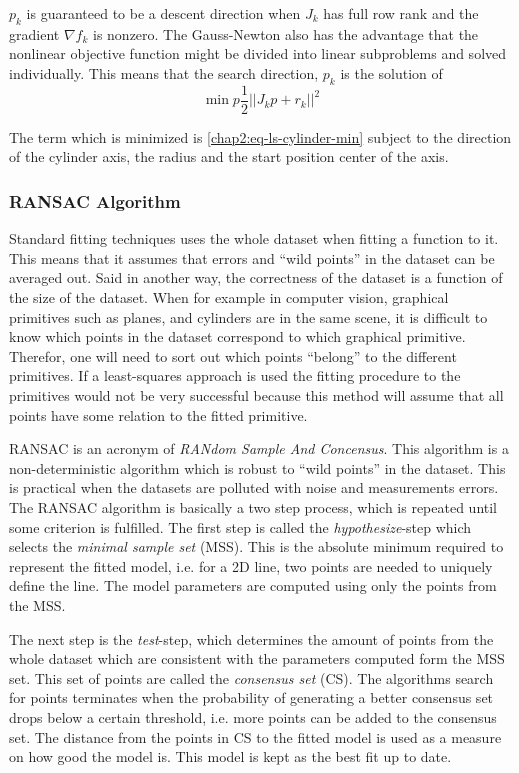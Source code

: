 $p_k$ is guaranteed to be a descent direction when $J_k$ has full row rank and the
gradient $\nabla f_k$ is nonzero. The Gauss-Newton also has the advantage that the
nonlinear objective function might be divided into linear subproblems and solved
individually. This means that the search direction, $p_k$ is the solution of
\begin{equation}
    \min{p} \frac{1}{2} || J_k p + r_k ||^2
\end{equation}

The term which is minimized is \eqref{chap2:eq-ls-cylinder-min} subject to the direction
of the cylinder axis, the radius and the start position center of the axis. 


\subsubsection{RANSAC Algorithm}
Standard fitting techniques uses the whole dataset when fitting a function to it. This
means that it assumes that errors and ``wild points'' in the dataset can be averaged out.
Said in another way, the correctness of the dataset is a function of the size of the
dataset. When for example in computer vision, graphical primitives such as planes, and
cylinders are in the same scene, it is difficult to know which points in the dataset
correspond to which graphical primitive. Therefor, one will need to sort out which points
``belong'' to the different primitives. If a least-squares approach is used the fitting
procedure to the primitives would not be very successful because this method will assume
that all points have some relation to the fitted primitive. \cite{ransac}

RANSAC is an acronym of \emph{RANdom Sample And Concensus}. This algorithm is a
non-deterministic algorithm which is robust to ``wild points'' in the dataset. This is
practical when the datasets are polluted with noise and measurements errors.
The RANSAC algorithm is basically a two step process, which is repeated until some
criterion is fulfilled. The first step is called the \emph{hypothesize}-step which selects
the \emph{minimal sample set} (MSS). This is the absolute minimum required to represent
the fitted model, i.e. for a 2D line, two points are needed to uniquely define the
line. The model parameters are computed using only the points from the MSS.

The next step is the \emph{test}-step, which determines the amount of points from the
whole dataset which are consistent with the parameters computed form the MSS set. This set
of points are called the \emph{consensus set} (CS). The algorithms search for points
terminates when the probability of generating a better consensus set drops below a certain threshold, i.e.
more points can be added to the consensus set. The distance from the points in CS to the 
fitted model is used as a measure on how good the model is. This model is kept as the best
fit up to date. \cite{ransac-dummies}

